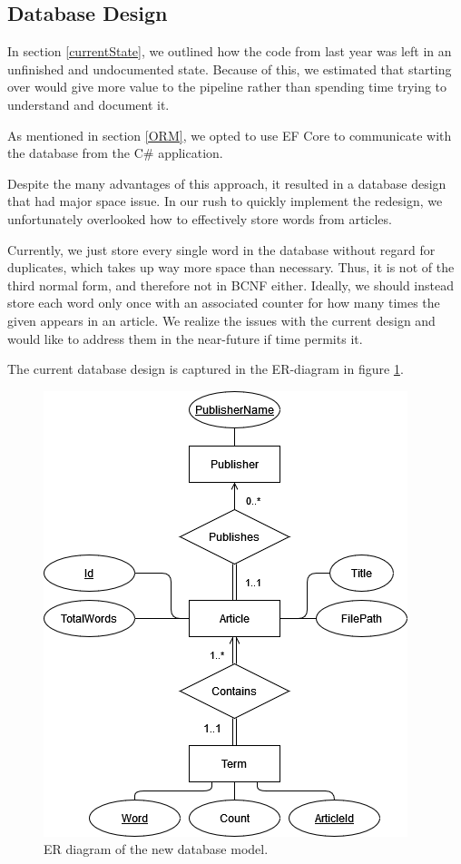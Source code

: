 \subsection{Database Design}\label{InitialDesign}

In section \ref{currentState}, we outlined how the code from last year was left in an unfinished and undocumented state. Because of this, we estimated that starting over would give more value to the pipeline rather than spending time trying to understand and document it.

As mentioned in section \ref{ORM}, we opted to use EF Core to communicate with the database from the C\# application.

Despite the many advantages of this approach, it resulted in a database design that had major space issue.
In our rush to quickly implement the redesign, we unfortunately overlooked how to effectively store words from articles. 

Currently, we just store every single word in the database without regard for duplicates, which takes up way more space than necessary. Thus, it is not of the third normal form, and therefore not in BCNF either.
Ideally, we should instead store each word only once with an associated counter for how many times the given appears in an article.
We realize the issues with the current design and would like to address them in the near-future if time permits it.

The current database design is captured in the ER-diagram in figure \ref{newdatabaseER}.

\begin{figure}[htb!]
    \centering
    \includegraphics[scale=0.6]{Images/DbRedesign.png}
    \caption{ER diagram of the new database model.}
    \label{newdatabaseER}
\end{figure}

